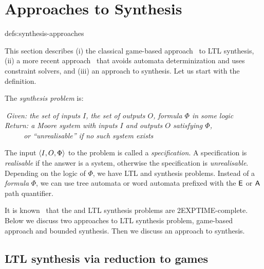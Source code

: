 \toclesslab\section{Approaches to Synthesis}{defs:synthesis-approaches} \label{defs:bounded_synthesis} \label{defs:synthesis-problem}

This section describes
(i) the classical game-based approach~\cite{DBLP:conf/popl/PnueliR89} to LTL synthesis,
(ii) a more recent approach~\cite{BS} that avoids automata determinization and uses constraint solvers, and
(iii) an approach to \CTLstar synthesis.
Let us start with the definition.

\smallskip
The \emph{synthesis problem} is:

\smallskip
\noindent
\emph{%
$~$Given: the set of inputs $I$, the set of outputs $O$, formula $\Phi$ in some logic\\
Return: a Moore system with inputs $I$ and outputs $O$ satisfying $\Phi$,}\\
$~~~~~~~~~~~~$\emph{or ``unrealisable'' if no such system exists}

\smallskip
\noindent
The input $\left<I,O,\Phi\right>$ to the problem is called a \emph{specification}.
A specification is \emph{realisable} if the answer is a system,
otherwise the specification is \emph{unrealisable}.
Depending on the logic of $\Phi$,
we have LTL and \CTLstar synthesis problems.
Instead of a \emph{formula} $\Phi$,
we can use tree automata or word automata prefixed with the ${\operatorname{\mathsf{E}}}$ or ${\operatorname{\mathsf{A}}}$ path quantifier.

\medskip
It is known~\cite{informatio,DBLP:conf/popl/PnueliR89} that
the \CTLstar and LTL synthesis problems are 2EXPTIME-complete.
Below we discuss two approaches to LTL synthesis problem,
game-based approach and bounded synthesis.
Then we discuss an approach to \CTLstar synthesis.


\subsection*{LTL synthesis via reduction to games}

